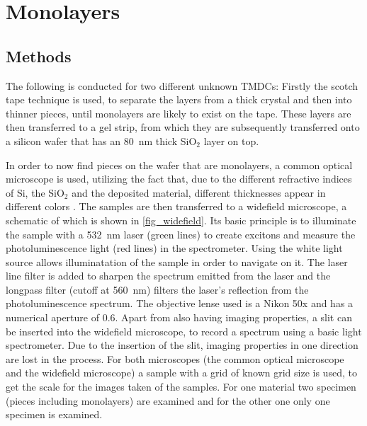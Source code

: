 \newpage
\section{Monolayers}
\label{sec:mono}

\subsection{Methods}

The following is conducted for two different unknown TMDCs:
Firstly the scotch tape technique is used, to separate the layers from a thick crystal and then into thinner pieces, until monolayers are likely to exist on the tape.
These layers are then transferred to a gel strip, from which they are subsequently transferred onto a silicon wafer that has an \SI{80}{nm} thick SiO$_2$ layer on top.

In order to now find pieces on the wafer that are monolayers, a common optical microscope is used, utilizing the fact that, due to the different refractive indices of Si, the SiO$_2$ and the deposited material, different thicknesses appear in different colors \cite{benameur2011}.
The samples are then transferred to a widefield microscope, a schematic of which is shown in \cref{fig_widefield}.
Its basic principle is to illuminate the sample with a \SI{532}{nm} laser (green lines) to create excitons and measure the photoluminescence light (red lines) in the spectrometer.
Using the white light source allows illuminatation of the sample in order to navigate on it.
The laser line filter is added to sharpen the spectrum emitted from the laser and the longpass filter (cutoff at \SI{560}{nm}) filters the laser's reflection from the photoluminescence spectrum.
The objective lense used is a Nikon 50x and has a numerical aperture of \SI{0.6}{}.
Apart from also having imaging properties, a slit can be inserted into the widefield microscope, to record a spectrum using a basic light spectrometer.
Due to the insertion of the slit, imaging properties in one direction are lost in the process.
For both microscopes (the common optical microscope and the widefield microscope) a sample with a grid of known grid size is used, to get the scale for the images taken of the samples.
For one material two specimen (pieces including monolayers) are examined and for the other one only one specimen is examined.

